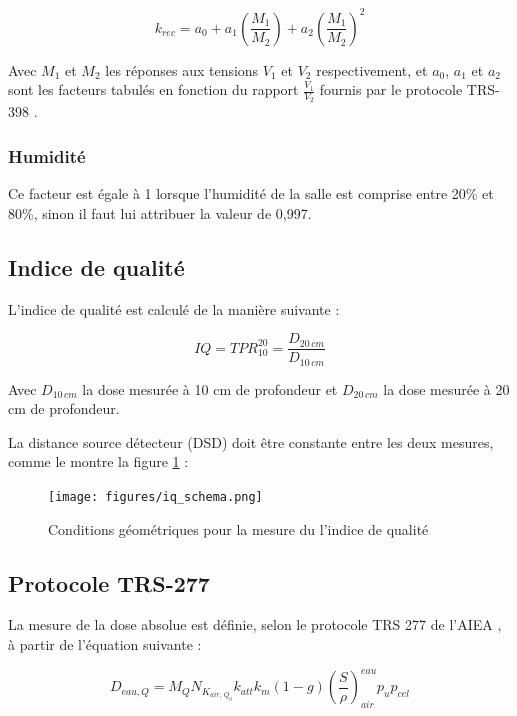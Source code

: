 \documentclass{article}
\begin{document}
\begin{equation}
  k_{rec} = a_0 + a_1 \left(\dfrac{M_1}{M_2}\right) + a_2 \left(\dfrac{M_1}{M_2}\right) ^2
  \label{eq_rec}
\end{equation}

Avec $M_1$ et $M_2$ les réponses aux tensions $V_1$ et $V_2$ respectivement, et $a_0$, $a_1$ et $a_2$ sont les facteurs tabulés en fonction du rapport $\frac{V_1}{V_2}$ fournis par le protocole TRS-398 \cite{international2001iaea}.

\subsubsection{Humidité}

Ce facteur est égale à 1 lorsque l'humidité de la salle est comprise entre 20\% et 80\%, sinon il faut lui attribuer la valeur de 0,997.

\subsection{Indice de qualité}

L'indice de qualité est calculé de la manière suivante :

\begin{equation}
  IQ = TPR^{20}_{10} = \dfrac{D_{20 \, cm}}{D_{10 \, cm}}
  \label{eq_iq}
\end{equation}

Avec $D_{10 \, cm}$ la dose mesurée à 10 cm de profondeur et $D_{20 \, cm}$ la dose mesurée à 20 cm de profondeur.

La distance source détecteur (DSD) doit être constante entre les deux mesures, comme le montre la figure \ref*{fig_tpr} :

\begin{figure}[h]
  \centering
  \texttt{[image: figures/iq\_schema.png]}
  \caption{Conditions géométriques pour la mesure du l'indice de qualité}
  \label{fig_tpr}
\end{figure}

\subsection{Protocole TRS-277}

La mesure de la dose absolue est définie, selon le protocole TRS 277 de l'AIEA \cite{internationaliaea}, à partir de l'équation suivante :

\begin{equation}
  D_{eau, Q} = M_Q N_{K_{air, \, Q_0}} k_{att} k_{m} (1-g) \left(\dfrac{S}{\rho}\right)^{eau}_{air} p_u p_{cel}
  \label{eq_dose_277}
\end{equation}
\end{document}
